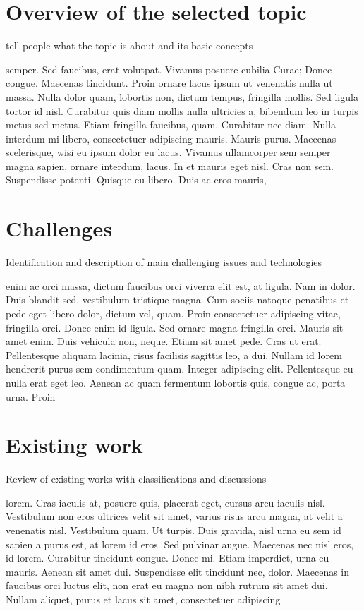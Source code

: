 \documentclass{acm_proc_article-sp}
\begin{document}
\section{Overview of the selected topic} %
\label{sec:overview}
tell people what the topic is about and its basic concepts

semper. Sed faucibus, erat volutpat. Vivamus posuere cubilia Curae; Donec congue. Maecenas tincidunt. Proin ornare lacus ipsum ut venenatis nulla ut massa. Nulla dolor quam, lobortis non, dictum tempus, fringilla mollis. Sed ligula tortor id nisl. Curabitur quis diam mollis nulla ultricies a, bibendum leo in turpis metus sed metus. Etiam fringilla faucibus, quam. Curabitur nec diam. Nulla interdum mi libero, consectetuer adipiscing mauris. Mauris purus. Maecenas scelerisque, wisi eu ipsum dolor eu lacus. Vivamus ullamcorper sem semper magna sapien, ornare interdum, lacus. In et mauris eget nisl. Cras non sem. Suspendisse potenti. Quisque eu libero. Duis ac eros mauris,

\section{Challenges} %
\label{sec:challenges}
Identification and description of main challenging issues and technologies

enim ac orci massa, dictum faucibus orci viverra elit est, at ligula. Nam in dolor. Duis blandit sed, vestibulum tristique magna. Cum sociis natoque penatibus et pede eget libero dolor, dictum vel, quam. Proin consectetuer adipiscing vitae, fringilla orci. Donec enim id ligula. Sed ornare magna fringilla orci. Mauris sit amet enim. Duis vehicula non, neque. Etiam sit amet pede. Cras ut erat. Pellentesque aliquam lacinia, risus facilisis sagittis leo, a dui. Nullam id lorem hendrerit purus sem condimentum quam. Integer adipiscing elit. Pellentesque eu nulla erat eget leo. Aenean ac quam fermentum lobortis quis, congue ac, porta urna. Proin

\section{Existing work} %
\label{sec:existing}
Review of existing works with classifications and discussions

lorem. Cras iaculis at, posuere quis, placerat eget, cursus arcu iaculis nisl. Vestibulum non eros ultrices velit sit amet, varius risus arcu magna, at velit a venenatis nisl. Vestibulum quam. Ut turpis. Duis gravida, nisl urna eu sem id sapien a purus est, at lorem id eros. Sed pulvinar augue. Maecenas nec nisl eros, id lorem. Curabitur tincidunt congue. Donec mi. Etiam imperdiet, urna eu mauris. Aenean sit amet dui. Suspendisse elit tincidunt nec, dolor. Maecenas in faucibus orci luctus elit, non erat eu magna non nibh rutrum sit amet dui. Nullam aliquet, purus et lacus sit amet, consectetuer adipiscing
\end{document}
